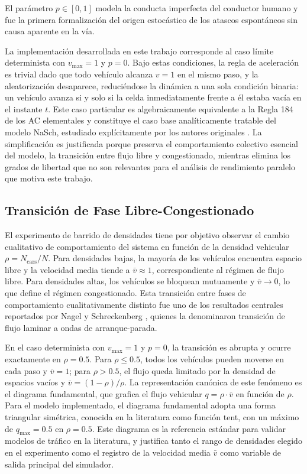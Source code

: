 El parámetro $p \in [0,1]$ modela la conducta imperfecta del conductor
humano y fue la primera formalización del origen estocástico de los
atascos espontáneos sin causa aparente en la vía.

La implementación desarrollada en este trabajo corresponde al caso límite
determinista con $v_{\max} = 1$ y $p = 0$. Bajo estas condiciones, la
regla de aceleración es trivial dado que todo vehículo alcanza $v = 1$
en el mismo paso, y la aleatorización desaparece, reduciéndose la
dinámica a una sola condición binaria: un vehículo avanza si y solo si
la celda inmediatamente frente a él estaba vacía en el instante $t$. Este
caso particular es algebraicamente equivalente a la Regla 184 de los AC
elementales y constituye el caso base analíticamente tratable del modelo
NaSch, estudiado explícitamente por los autores originales
\parencite{NagelSchreckenberg1992}. La simplificación es justificada
porque preserva el comportamiento colectivo esencial del modelo, la
transición entre flujo libre y congestionado, mientras elimina los
grados de libertad que no son relevantes para el análisis de rendimiento
paralelo que motiva este trabajo.

\subsection{Transición de Fase Libre-Congestionado}

El experimento de barrido de densidades tiene por objetivo observar el
cambio cualitativo de comportamiento del sistema en función de la
densidad vehicular $\rho = N_{\mathrm{cars}} / N$. Para densidades bajas,
la mayoría de los vehículos encuentra espacio libre y la velocidad media
tiende a $\bar{v} \approx 1$, correspondiente al régimen de flujo libre.
Para densidades altas, los vehículos se bloquean mutuamente y $\bar{v}
\to 0$, lo que define el régimen congestionado. Esta transición entre
fases de comportamiento cualitativamente distinto fue uno de los
resultados centrales reportados por Nagel y Schreckenberg
\parencite{NagelSchreckenberg1992}, quienes la denominaron transición de
flujo laminar a ondas de arranque-parada.

En el caso determinista con $v_{\max} = 1$ y $p = 0$, la transición es
abrupta y ocurre exactamente en $\rho = 0.5$. Para $\rho \leq 0.5$,
todos los vehículos pueden moverse en cada paso y $\bar{v} = 1$; para
$\rho > 0.5$, el flujo queda limitado por la densidad de espacios vacíos
y $\bar{v} = (1 - \rho) / \rho$. La representación canónica de este
fenómeno es el diagrama fundamental, que grafica el flujo vehicular
$q = \rho \cdot \bar{v}$ en función de $\rho$. Para el modelo
implementado, el diagrama fundamental adopta una forma triangular
simétrica, conocida en la literatura como función tent, con un máximo
de $q_{\max} = 0.5$ en $\rho = 0.5$. Este diagrama es la referencia
estándar para validar modelos de tráfico en la literatura, y justifica
tanto el rango de densidades elegido en el experimento como el registro
de la velocidad media $\bar{v}$ como variable de salida principal del
simulador.

